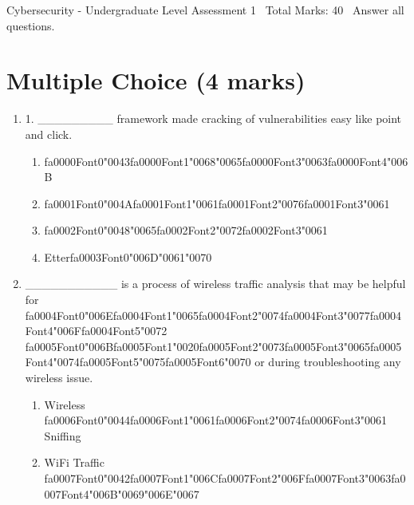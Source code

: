 \documentclass[12pt]{article}
\begin{document}
\begin{center}
Cybersecurity - Undergraduate Level Assessment 1 \
Total Marks: 40 \
Answer all questions.
\end{center}

\section*{Multiple Choice (4 marks)}
\begin{enumerate}[label=\arabic*.]
\item 1. \_\_\_\_\_\_\_\_\_ framework made cracking of vulnerabilities easy like point and click.
\begin{enumerate}[label=(\alph*)]
    \item {\csname fa0000Font0\endcsname\char"0043}{\csname fa0000Font1\endcsname\char"0068}{\char"0065}{\csname fa0000Font3\endcsname\char"0063}{\csname fa0000Font4\endcsname\char"006B}
    \item {\csname fa0001Font0\endcsname\char"004A}{\csname fa0001Font1\endcsname\char"0061}{\csname fa0001Font2\endcsname\char"0076}{\csname fa0001Font3\endcsname\char"0061}
    \item {\csname fa0002Font0\endcsname\char"0048}{\char"0065}{\csname fa0002Font2\endcsname\char"0072}{\csname fa0002Font3\endcsname\char"0061}
    \item Etter{\csname fa0003Font0\endcsname\char"006D}{\char"0061}{\char"0070}
\end{enumerate}
\item \_\_\_\_\_\_\_\_\_\_\_ is a process of wireless traffic analysis that may be helpful for {\csname fa0004Font0\endcsname\char"006E}{\csname fa0004Font1\endcsname\char"0065}{\csname fa0004Font2\endcsname\char"0074}{\csname fa0004Font3\endcsname\char"0077}{\csname fa0004Font4\endcsname\char"006F}{\csname fa0004Font5\endcsname\char"0072} {\csname fa0005Font0\endcsname\char"006B}{\csname fa0005Font1\endcsname\char"0020}{\csname fa0005Font2\endcsname\char"0073}{\csname fa0005Font3\endcsname\char"0065}{\csname fa0005Font4\endcsname\char"0074}{\csname fa0005Font5\endcsname\char"0075}{\csname fa0005Font6\endcsname\char"0070} or during troubleshooting any wireless issue.
\begin{enumerate}[label=(\alph*)]
    \item Wireless {\csname fa0006Font0\endcsname\char"0044}{\csname fa0006Font1\endcsname\char"0061}{\csname fa0006Font2\endcsname\char"0074}{\csname fa0006Font3\endcsname\char"0061} Sniffing
    \item WiFi Traffic {\csname fa0007Font0\endcsname\char"0042}{\csname fa0007Font1\endcsname\char"006C}{\csname fa0007Font2\endcsname\char"006F}{\csname fa0007Font3\endcsname\char"0063}{\csname fa0007Font4\endcsname\char"006B}{\char"0069}{\char"006E}{\char"0067}

\end{enumerate}
\end{enumerate}
\end{document}
